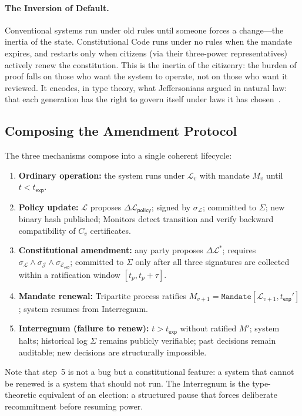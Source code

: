 \paragraph{The Inversion of Default.}
Conventional systems run under old rules until someone forces a
change---the inertia of the state. Constitutional Code runs under
no rules when the mandate expires, and restarts only when citizens
(via their three-power representatives) actively renew the
constitution. This is the inertia of the citizenry: the burden of
proof falls on those who want the system to operate, not on those
who want it reviewed. It encodes, in type theory, what Jeffersonians
argued in natural law: that each generation has the right to govern
itself under laws it has chosen~\cite{jefferson1789}.

\subsection{Composing the Amendment Protocol}
\label{subsec:composition}

The three mechanisms compose into a single coherent lifecycle:

\begin{enumerate}
  \item \textbf{Ordinary operation:} the system runs under
  $\mathcal{L}_v$ with mandate $M_v$ until $t < t_{\mathsf{exp}}$.
  \item \textbf{Policy update:} $\mathcal{L}$ proposes
  $\Delta\mathcal{L}_{\mathsf{policy}}$; signed by $\sigma_{\mathcal{L}}$;
  committed to $\Sigma$; new binary hash published; Monitors detect
  transition and verify backward compatibility of $C_v$ certificates.
  \item \textbf{Constitutional amendment:} any party proposes
  $\Delta\mathcal{L}^*$; requires $\sigma_{\mathcal{L}} \wedge
  \sigma_{\mathcal{J}} \wedge \sigma_{\mathcal{E}_{\mathsf{rep}}}$;
  committed to $\Sigma$ only after all three signatures are collected
  within a ratification window $[t_p, t_p + \tau]$.
  \item \textbf{Mandate renewal:} Tripartite process ratifies $M_{v+1}
  = \texttt{Mandate}[\mathcal{L}_{v+1}, t_{\mathsf{exp}}']$; system
  resumes from Interregnum.
  \item \textbf{Interregnum (failure to renew):} $t > t_{\mathsf{exp}}$
  without ratified $M'$; system halts; historical log $\Sigma$ remains
  publicly verifiable; past decisions remain auditable; new decisions
  are structurally impossible.
\end{enumerate}

Note that step~5 is not a bug but a constitutional feature: a system
that cannot be renewed is a system that should not run. The Interregnum
is the type-theoretic equivalent of an election: a structured pause
that forces deliberate recommitment before resuming power.

